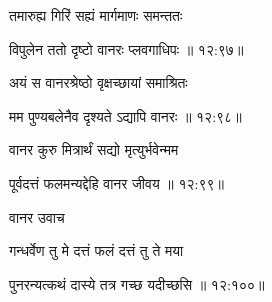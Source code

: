 {\devanagarifont तमारुह्य गिरिं सह्यं मार्गमाणः समन्ततः \thinspace{\danda} \dontdisplaylinenum }%


{\devanagarifont विपुलेन ततो दृष्टो वानरः प्लवगाधिपः {॥ १२:९७॥} \veg\dontdisplaylinenum }%

{\devanagarifont अयं स वानरश्रेष्ठो वृक्षच्छायां समाश्रितः \thinspace{\dandab} \dontdisplaylinenum }%


{\devanagarifont मम पुण्यबलेनैव दृश्यते ऽद्यापि वानरः {॥ १२:९८॥} \veg\dontdisplaylinenum }%
 
{\devanagarifont वानर कुरु मित्रार्थं सद्यो मृत्युर्भवेन्मम \thinspace{\dandab} \dontdisplaylinenum }%


{\devanagarifont पूर्वदत्तं फलमन्यद्देहि वानर जीवय {॥ १२:९९॥} \veg\dontdisplaylinenum }%

{\devanagarifont वानर उवाच {\dandab}\dontdisplaylinenum  }%
 
{\devanagarifont गन्धर्वेण तु मे दत्तं फलं दत्तं तु ते मया \thinspace{\danda} \dontdisplaylinenum }%


{\devanagarifont पुनरन्यत्कथं दास्ये तत्र गच्छ यदीच्छसि {॥ १२:१००॥} \veg\dontdisplaylinenum }%
 
